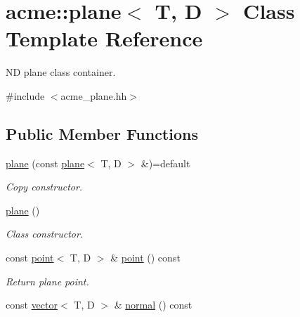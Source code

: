 \hypertarget{classacme_1_1plane}{}\section{acme\+:\+:plane$<$ T, D $>$ Class Template Reference}
\label{classacme_1_1plane}


ND plane class container.  




{\ttfamily \#include $<$acme\+\_\+plane.\+hh$>$}

\subsection*{Public Member Functions}
\begin{DoxyCompactItemize}
\item 
\mbox{\label{classacme_1_1plane_a2e6f6a6899f7b4212e42e87e5f5b3cf9}} 
\hyperlink{classacme_1_1plane_a2e6f6a6899f7b4212e42e87e5f5b3cf9}{plane} (const \hyperlink{classacme_1_1plane}{plane}$<$ T, D $>$ \&)=default
\begin{DoxyCompactList}\small\item\em Copy constructor. \end{DoxyCompactList}\item 
\mbox{\label{classacme_1_1plane_a63e74db85cea2b9a290ff71fc85ec874}} 
\hyperlink{classacme_1_1plane_a63e74db85cea2b9a290ff71fc85ec874}{plane} ()
\begin{DoxyCompactList}\small\item\em Class constructor. \end{DoxyCompactList}\item 
\mbox{\label{classacme_1_1plane_a1493555a6c7db6dc050dac80d5d7a046}} 
const \hyperlink{classacme_1_1point}{point}$<$ T, D $>$ \& \hyperlink{classacme_1_1plane_a1493555a6c7db6dc050dac80d5d7a046}{point} () const
\begin{DoxyCompactList}\small\item\em Return plane point. \end{DoxyCompactList}\item 
\mbox{\label{classacme_1_1plane_aa01e59b940e48eeb36fdd6fac5d5ca05}} 
const \hyperlink{classacme_1_1vector}{vector}$<$ T, D $>$ \& \hyperlink{classacme_1_1plane_aa01e59b940e48eeb36fdd6fac5d5ca05}{normal} () const

\end{DoxyCompactItemize}
